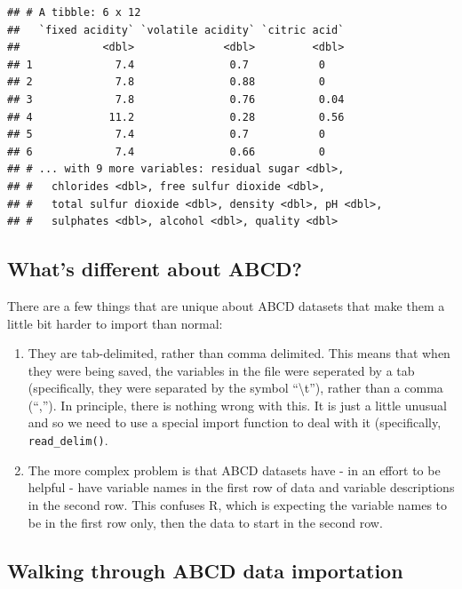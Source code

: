 \documentclass[
]{book}
\begin{document}
\begin{verbatim}
## # A tibble: 6 x 12
##   `fixed acidity` `volatile acidity` `citric acid`
##             <dbl>              <dbl>         <dbl>
## 1             7.4               0.7           0   
## 2             7.8               0.88          0   
## 3             7.8               0.76          0.04
## 4            11.2               0.28          0.56
## 5             7.4               0.7           0   
## 6             7.4               0.66          0   
## # ... with 9 more variables: residual sugar <dbl>,
## #   chlorides <dbl>, free sulfur dioxide <dbl>,
## #   total sulfur dioxide <dbl>, density <dbl>, pH <dbl>,
## #   sulphates <dbl>, alcohol <dbl>, quality <dbl>
\end{verbatim}

\hypertarget{whats-different-about-abcd}{%
\subsection{What's different about ABCD?}\label{whats-different-about-abcd}}

There are a few things that are unique about ABCD datasets that make them a little bit harder to import than normal:

\begin{enumerate}
\def\labelenumi{\arabic{enumi}.}
\item
  They are tab-delimited, rather than comma delimited. This means that when they were being saved, the variables in the file were seperated by a tab (specifically, they were separated by the symbol ``\textbackslash t''), rather than a comma (``,''). In principle, there is nothing wrong with this. It is just a little unusual and so we need to use a special import function to deal with it (specifically, \texttt{read\_delim()}.
\item
  The more complex problem is that ABCD datasets have - in an effort to be helpful - have variable names in the first row of data and variable descriptions in the second row. This confuses R, which is expecting the variable names to be in the first row only, then the data to start in the second row.
\end{enumerate}

\hypertarget{walking-through-abcd-data-importation}{%
\subsection{Walking through ABCD data importation}\label{walking-through-abcd-data-importation}}
\end{document}
